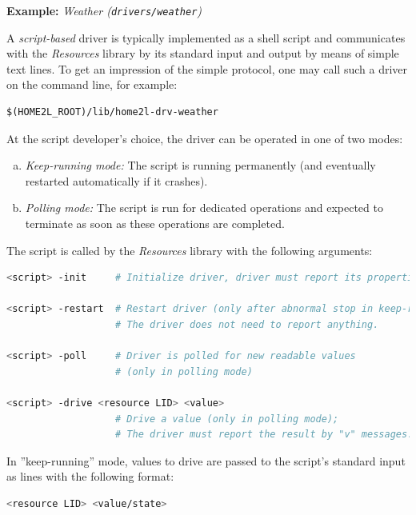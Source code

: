 \documentclass[12pt,english,parskip=half]{scrreprt}
\begin{document}
\textbf{Example:} \emph{Weather (\texttt{drivers/weather})}

A \emph{script-based} driver is typically implemented as a shell script
and communicates with the \emph{Resources} library by its standard input
and output by means of simple text lines. To get an impression of the
simple protocol, one may call such a driver on the command line, for example:

\begin{lstlisting}
$(HOME2L_ROOT)/lib/home2l-drv-weather
\end{lstlisting}

At the script developer's choice, the driver can be operated in one of
two modes:

\begin{enumerate}[a)]

\item
  \emph{Keep-running mode:} The script is running permanently (and
  eventually restarted automatically if it crashes).

\item
  \emph{Polling mode:} The script is run for dedicated operations and
  expected to terminate as soon as these operations are completed.

\end{enumerate}

The script is called by the \emph{Resources} library with the following arguments:

\begin{lstlisting}[language=bash]
<script> -init     # Initialize driver, driver must report its properties (see below)

<script> -restart  # Restart driver (only after abnormal stop in keep-running mode);
                   # The driver does not need to report anything.

<script> -poll     # Driver is polled for new readable values
                   # (only in polling mode)

<script> -drive <resource LID> <value>
                   # Drive a value (only in polling mode);
                   # The driver must report the result by "v" messages.
\end{lstlisting}

In ''keep-running'' mode, values to drive are passed to the script's
standard input as lines with the following format:

\begin{lstlisting}[language=bash]
<resource LID> <value/state>
\end{lstlisting}
\end{document}
